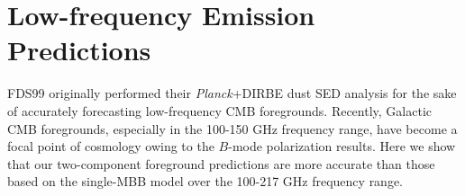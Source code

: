 \documentclass{emulateapj}
\newcommand{\IRAS}{{\it IRAS}}
\newcommand{\PLANCK}{{\it Planck}}
\begin{document}


\section{Low-frequency Emission Predictions}
FDS99 originally performed their \PLANCK+DIRBE dust SED analysis for the sake 
of accurately forecasting low-frequency CMB foregrounds. Recently, Galactic CMB
foregrounds, especially in the 100-150 GHz frequency range, have become a focal
point of cosmology owing to the \cite{bicep2} $B$-mode polarization results. 
Here we show that our two-component foreground predictions are more accurate 
than those based on the \cite{planckdust} single-MBB model over the 100-217 GHz
frequency range.





\end{document}
